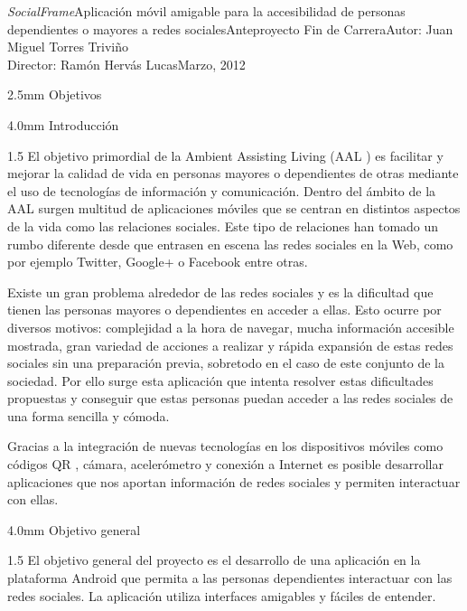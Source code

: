 \documentclass[12pt,a4paper,spanish,oneside]{report}
\makeatletter
\renewcommand{\section}{
  \@startsection{section}{1}{0mm}{\baselineskip}
  {2.5mm}{\huge\bf}
}
\renewcommand{\subsection}{
  \@startsection{subsection}{2}{0mm}{2mm}
  {4.0mm}{\Large\bf}
}
\theoremstyle{plain} \newtheorem{nota}{Nota}
\makeatother
\begin{document}
\marginsize{2.5cm}{2cm}{3cm}{2cm}
{\emph{SocialFrame}}{Aplicación móvil amigable para la accesibilidad de personas dependientes o mayores a redes sociales}{Anteproyecto Fin de Carrera}{Autor: Juan Miguel Torres Triviño\\Director: Ramón Hervás Lucas}{Marzo, 2012}
\marginsize{3.5cm}{2cm}{2.5cm}{2.5cm}
\renewcommand*{\contentsname}{Índice de Contenidos}
\tableofcontents
\newpage
\section{Objetivos}
\subsection{Introducción}
\begin{spacing}{1.5}
El objetivo primordial de la Ambient Assisting Living (AAL \cite{AAL}) es 
facilitar y mejorar la calidad de vida en personas mayores o dependientes de 
otras mediante el uso de tecnologías de información y comunicación. Dentro del
ámbito de la AAL surgen multitud de aplicaciones móviles que se centran en 
distintos aspectos de la vida como las relaciones sociales. Este tipo de 
relaciones han tomado un rumbo diferente desde que entrasen en escena las redes
 sociales en la Web, como por ejemplo Twitter, Google+ o Facebook entre otras. 

Existe un gran problema alrededor de las redes sociales y es la dificultad que
tienen las personas mayores o dependientes en acceder a ellas. Esto ocurre por 
diversos motivos: complejidad a la hora de navegar, mucha información accesible 
mostrada, gran variedad de acciones a realizar y rápida expansión de estas 
redes sociales sin una preparación previa, sobretodo en el caso de este conjunto
de la sociedad. Por ello surge esta aplicación que intenta resolver estas 
dificultades propuestas y conseguir que estas personas puedan acceder a las 
redes sociales de una forma sencilla y cómoda.

Gracias a la integración de nuevas tecnologías en los dispositivos móviles como
códigos QR \cite{QR}, cámara, acelerómetro y conexión a Internet es posible 
desarrollar aplicaciones que nos aportan información de redes sociales y 
permiten interactuar con ellas.
\end{spacing}
\subsection{Objetivo general}
\begin{spacing}{1.5}
El objetivo general del proyecto es el desarrollo de una aplicación en la 
plataforma Android que permita a las personas dependientes interactuar con las 
redes sociales. La aplicación utiliza interfaces amigables y fáciles de 
entender.
\end{spacing}
\end{document}
